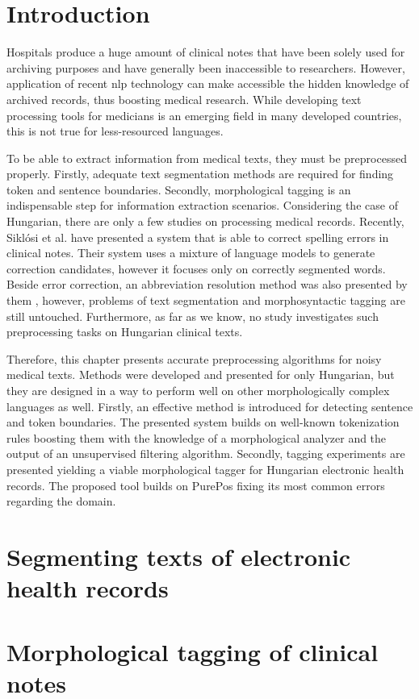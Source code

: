 
\section{Introduction}

Hospitals produce a huge amount of clinical notes that have been solely used for archiving purposes and have generally been inaccessible to researchers. 
However, application of recent \acrshort{nlp} technology can make accessible the hidden knowledge of archived records, thus boosting medical research. 
While developing text processing tools for medicians is an emerging field in many developed countries, this is not true for less-resourced languages.

To be able to extract information from medical texts, they must be preprocessed properly. 
Firstly, adequate text segmentation methods 
are required for finding token and sentence boundaries. 
Secondly, morphological tagging is an indispensable step for information extraction scenarios. 
Considering the case of Hungarian, there are only a few studies on processing medical records. 
Recently, Siklósi et al. \cite{Siklosi2012,Siklosi2013} have presented a system that is able to correct spelling errors in clinical notes. 
Their system uses a mixture of language models to generate correction candidates, however it focuses only on correctly segmented words. 
Beside error correction, an abbreviation resolution method was also presented by them \cite{Siklosi2013b}, however, problems of text segmentation and  morphosyntactic tagging are still untouched. 
Furthermore, as far as we know, no study investigates such preprocessing tasks on Hungarian clinical texts. 

Therefore, this chapter presents accurate preprocessing algorithms for noisy medical texts.
Methods were developed and presented for only Hungarian, but they are designed in a way to perform well on other morphologically complex languages as well. 
Firstly, an effective method is introduced for detecting sentence and token boundaries.
The presented system builds on well-known tokenization rules boosting them with the knowledge of a morphological analyzer and the output of an unsupervised filtering algorithm.
Secondly, tagging experiments are presented yielding a viable morphological tagger for Hungarian electronic health records. 
The proposed tool builds on PurePos fixing its most common errors regarding the domain.

\section{Segmenting texts of electronic health records}\label{sec:clin_segm}


\pagebreak

\section{Morphological tagging of clinical notes}\label{sec:clin_tag}


